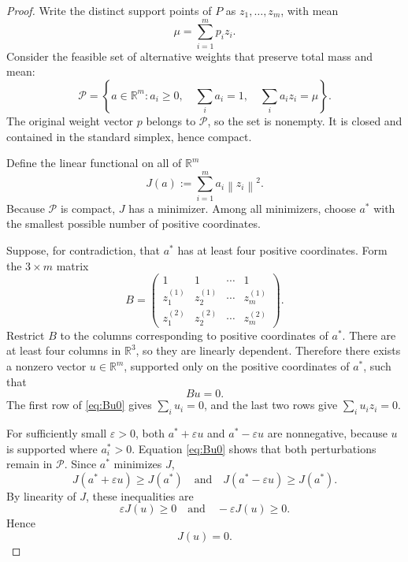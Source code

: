 \documentclass[11pt]{article}
\theoremstyle{definition}
\theoremstyle{remark}
\newcommand{\R}{\mathbb{R}}
\newcommand{\norm}[1]{\left\lVert #1\right\rVert}
\begin{document}
\begin{proof}
Write the distinct support points of $P$ as $z_1,\ldots,z_m$, with mean
\[
\mu=\sum_{i=1}^m p_i z_i.
\]
Consider the feasible set of alternative weights that preserve total mass and mean:
\begin{equation}
\mathcal P=
\left\{a\in\R^m:
 a_i\ge0,\quad
 \sum_i a_i=1,\quad
 \sum_i a_i z_i=\mu
\right\}.
\label{eq:weight-polytope}
\end{equation}
The original weight vector $p$ belongs to $\mathcal P$, so the set is nonempty.  It is closed and contained in the standard simplex, hence compact.

Define the linear functional on all of $\R^m$
\begin{equation}
J(a):=\sum_{i=1}^m a_i\norm{z_i}^2.
\label{eq:J}
\end{equation}
Because $\mathcal P$ is compact, $J$ has a minimizer.  Among all minimizers, choose $a^*$ with the smallest possible number of positive coordinates.

Suppose, for contradiction, that $a^*$ has at least four positive coordinates.  Form the $3\times m$ matrix
\begin{equation}
B=
\begin{pmatrix}
1&1&\cdots&1\\
z_1^{(1)}&z_2^{(1)}&\cdots&z_m^{(1)}\\
z_1^{(2)}&z_2^{(2)}&\cdots&z_m^{(2)}
\end{pmatrix}.
\label{eq:B-matrix}
\end{equation}
Restrict $B$ to the columns corresponding to positive coordinates of $a^*$.  There are at least four columns in $\R^3$, so they are linearly dependent.  Therefore there exists a nonzero vector $u\in\R^m$, supported only on the positive coordinates of $a^*$, such that
\begin{equation}
Bu=0.
\label{eq:Bu0}
\end{equation}
The first row of \eqref{eq:Bu0} gives $\sum_i u_i=0$, and the last two rows give $\sum_i u_i z_i=0$.

For sufficiently small $\varepsilon>0$, both $a^*+\varepsilon u$ and $a^*-\varepsilon u$ are nonnegative, because $u$ is supported where $a_i^*>0$.  Equation \eqref{eq:Bu0} shows that both perturbations remain in $\mathcal P$.  Since $a^*$ minimizes $J$,
\[
J(a^*+\varepsilon u)\ge J(a^*)
\quad\text{and}\quad
J(a^*-\varepsilon u)\ge J(a^*).
\]
By linearity of $J$, these inequalities are
\[
\varepsilon J(u)\ge0
\quad\text{and}\quad
-\varepsilon J(u)\ge0.
\]
Hence
\begin{equation}
J(u)=0.
\label{eq:Ju0}
\end{equation}


\end{proof}
\end{document}
